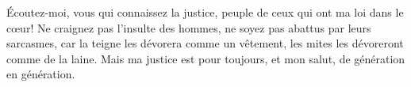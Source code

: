 Écoutez-moi, vous qui connaissez la justice,
	peuple de ceux qui ont ma loi dans le cœur!
Ne craignez pas l’insulte des hommes,
	ne soyez pas abattus par leurs sarcasmes,
	car la teigne les dévorera comme un vêtement,
	les mites les dévoreront comme de la laine.
Mais ma justice est pour toujours,
	et mon salut, de génération en génération.
